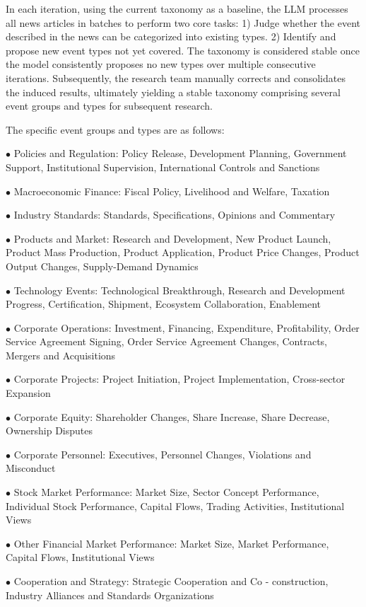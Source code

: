 \documentclass[sigconf, nonacm]{acmart} %
\begin{document}
In each iteration, using the current taxonomy as a baseline, the LLM processes all news articles in batches to perform two core tasks: 1) Judge whether the event described in the news can be categorized into existing types. 2) Identify and propose new event types not yet covered. The taxonomy is considered stable once the model consistently proposes no new types over multiple consecutive iterations. Subsequently, the research team manually corrects and consolidates the induced results, ultimately yielding a stable taxonomy comprising several event groups and types for subsequent research.

The specific event groups and types are as follows:

$\bullet$ Policies and Regulation: Policy Release, Development Planning, Government Support, Institutional Supervision, International Controls and Sanctions

$\bullet$ Macroeconomic Finance: Fiscal Policy, Livelihood and Welfare, Taxation

$\bullet$ Industry Standards: Standards, Specifications, Opinions and Commentary

$\bullet$ Products and Market: Research and Development, New Product Launch, Product Mass Production, Product Application, Product Price Changes, Product Output Changes, Supply-Demand Dynamics

$\bullet$ Technology Events: Technological Breakthrough, Research and Development Progress, Certification, Shipment, Ecosystem Collaboration, Enablement

$\bullet$ Corporate Operations: Investment, Financing, Expenditure, Profitability, Order Service Agreement Signing, Order Service Agreement Changes, Contracts, Mergers and Acquisitions

$\bullet$ Corporate Projects: Project Initiation, Project Implementation, Cross-sector Expansion

$\bullet$ Corporate Equity: Shareholder Changes, Share Increase, Share Decrease, Ownership Disputes

$\bullet$ Corporate Personnel: Executives, Personnel Changes, Violations and Misconduct

$\bullet$ Stock Market Performance: Market Size, Sector Concept Performance, Individual Stock Performance, Capital Flows, Trading Activities, Institutional Views

$\bullet$ Other Financial Market Performance: Market Size, Market Performance, Capital Flows, Institutional Views

$\bullet$ Cooperation and Strategy: Strategic Cooperation and Co - construction, Industry Alliances and Standards Organizations
\end{document}

